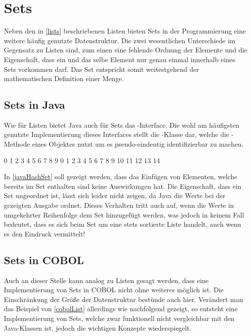 \section{Sets}
Neben den in \autoref{lists} beschriebenen Listen bieten Sets in der Programmierung eine weitere häufig genutzte Datenstruktur. Die zwei wesentlichen Unterschiede im Gegensatz zu Listen sind, zum einen eine fehlende Ordnung der Elemente und die Eigenschaft, dass ein und das selbe Element nur genau einmal innerhalb eines Sets vorkommen darf. Das Set entspricht somit weitestgehend der mathematischen Definition einer Menge.\\

\subsection*{Sets in Java}
Wie für Listen bietet Java auch für Sets das -Interface. Die wohl am häufigsten genutzte Implementierung dieses Interfaces stellt die -Klasse dar, welche die -Methode eines Objektes nutzt um es pseudo-eindeutig identifizierbar zu machen.\\

\begin{shellwindow}
0 1 2 3 4 5 6 7 8 9 
0 1 2 3 4 5 6 7 8 9 10 11 12 13 14 
\end{shellwindow}

In \autoref{javaHashSet} soll gezeigt werden, dass das Einfügen von Elementen, welche bereits im Set enthalten sind keine Auswirkungen hat. Die Eigenschaft, dass ein Set ungeordnet ist, lässt sich leider nicht zeigen, da Java die Werte bei der gezeigten Ausgabe ordnet. Dieses Verhalten tritt auch auf, wenn die Werte in umgekehrter Reihenfolge dem Set hinzugefügt werden, was jedoch in keinem Fall bedeutet, dass es sich beim Set um eine stets sortierte Liste handelt, auch wenn es den Eindruck vermittelt!\\

\subsection*{Sets in COBOL}
Auch an dieser Stelle kann analog zu Listen gesagt werden, dass eine Implementierung von Sets in COBOL nicht ohne weiteres möglich ist. Die Einschränkung der Größe der Datenstruktur bestünde auch hier. Verändert man das Beispiel von \autoref{cobolList} allerdings wie nachfolgend gezeigt, so entsteht eine Implementierung von Sets, welche zwar funktionell nicht vergleichbar mit den Java-Klassen ist, jedoch die wichtigen Konzepte wiederspiegelt.

